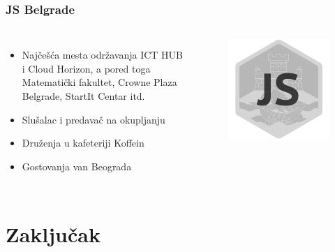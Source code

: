 \documentclass[hyperref={bookmarks=false},aspectratio=169]{beamer}
\begin{document}
\begin{frame}
\frametitle{JS Belgrade}

\begin{columns}[T]

\begin{itemize}
    \item Najčešća mesta održavanja ICT HUB i Cloud Horizon, a pored toga Matematički fakultet, Crowne Plaza Belgrade, StartIt Centar itd.
    \item Slušalac i predavač na okupljanju
    \item Druženja u kafeteriji Koffein %
    \item Gostovanja van Beograda %
\end{itemize}


\begin{figure}
    \raggedleft
    \includegraphics[scale=0.2]{./images/JS_logo.png}
\end{figure}
\end{columns}
\end{frame}

\section{Zaključak}
\end{document}
